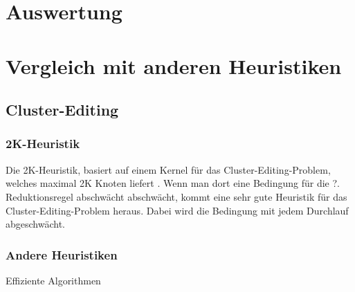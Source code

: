 \documentclass[12pt,a4paper,onecolumn,oneside,titlepage]{article}
\begin{document}
\section{Auswertung}
\section{Vergleich mit anderen Heuristiken}
\subsection{Cluster-Editing}
\subsubsection{2K-Heuristik}
Die 2K-Heuristik, basiert auf einem Kernel für das Cluster-Editing-Problem, welches maximal 2K Knoten liefert \cite{ChenM12}. Wenn man dort eine Bedingung für die ?. Reduktionsregel abschwächt  abschwächt, kommt eine sehr gute Heuristik für das Cluster-Editing-Problem heraus. Dabei wird die Bedingung mit jedem Durchlauf abgeschwächt.
\pagebreak
\begin{center}
  \label{euclid}
\begin{algorithmic}[1]
			\EndFor
		\EndIf
	\EndFor
\EndWhile

\EndFunction

	\EndFor

\EndFunction
{}
	\EndFor

\EndFunction
\end{algorithmic}
\end{center}


\subsubsection{Andere Heuristiken}
\cite{Bastos2014} Effiziente Algorithmen
\end{document}
